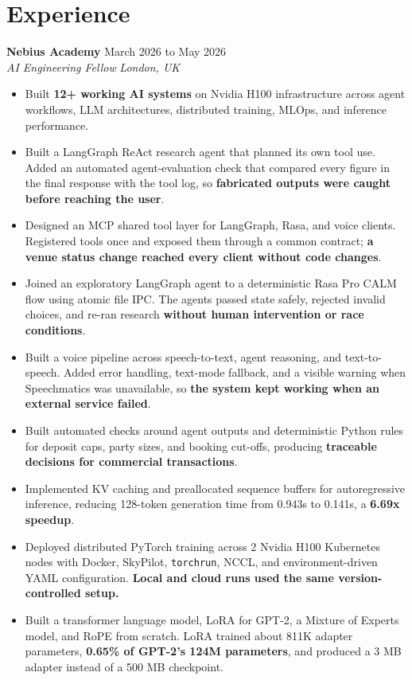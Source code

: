\documentclass[a4paper,10pt]{article}
\newcommand{\role}[4]{
  \needspace{4\baselineskip}
  \textbf{\color{accent}#1} \hfill {\small #2}\\[-1pt]
  \textit{#3} \hfill {\small\textit{#4}}
}
\begin{document}
\section{Experience}
\role{Nebius Academy}{March 2026 to May 2026}{AI Engineering Fellow}{London, UK}
\begin{itemize}
  \item Built \textbf{12+ working AI systems} on Nvidia H100 infrastructure across agent workflows, LLM architectures, distributed training, MLOps, and inference performance.
  \item Built a LangGraph ReAct research agent that planned its own tool use. Added an automated agent-evaluation check that compared every figure in the final response with the tool log, so \textbf{fabricated outputs were caught before reaching the user}.
  \item Designed an MCP shared tool layer for LangGraph, Rasa, and voice clients. Registered tools once and exposed them through a common contract; \textbf{a venue status change reached every client without code changes}.
  \item Joined an exploratory LangGraph agent to a deterministic Rasa Pro CALM flow using atomic file IPC. The agents passed state safely, rejected invalid choices, and re-ran research \textbf{without human intervention or race conditions}.
  \item Built a voice pipeline across speech-to-text, agent reasoning, and text-to-speech. Added error handling, text-mode fallback, and a visible warning when Speechmatics was unavailable, so \textbf{the system kept working when an external service failed}.
  \item Built automated checks around agent outputs and deterministic Python rules for deposit caps, party sizes, and booking cut-offs, producing \textbf{traceable decisions for commercial transactions}.
  \item Implemented KV caching and preallocated sequence buffers for autoregressive inference, reducing 128-token generation time from 0.943s to 0.141s, a \textbf{6.69x speedup}.
  \item Deployed distributed PyTorch training across 2 Nvidia H100 Kubernetes nodes with Docker, SkyPilot, \texttt{torchrun}, NCCL, and environment-driven YAML configuration. \textbf{Local and cloud runs used the same version-controlled setup.}
  \item Built a transformer language model, LoRA for GPT-2, a Mixture of Experts model, and RoPE from scratch. LoRA trained about 811K adapter parameters, \textbf{0.65\% of GPT-2's 124M parameters}, and produced a 3 MB adapter instead of a 500 MB checkpoint.
\end{itemize}
\end{document}
